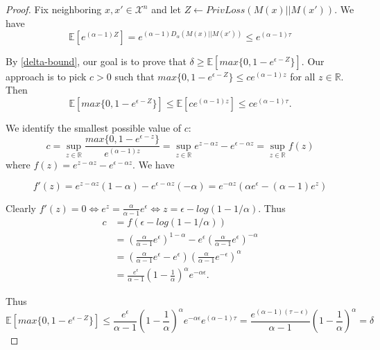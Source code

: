 \documentclass{article}
\begin{document}
\begin{proof}
Fix neighboring $x, x' \in  \mathcal{X}^n$ and let $Z \leftarrow PrivLoss(M(x) || M(x'))$. We have
\begin{equation}
    \mathbb{E}[e^{(\alpha - 1) Z}] = e^{(\alpha - 1)D_\alpha(M(x) || M(x'))} \leq e^{(\alpha - 1)\tau}
\end{equation}

By \ref{delta-bound}, our goal is to prove that $\delta \geq \mathbb{E}[max\{0, 1 - e^{\epsilon - Z} \}]$.
Our approach is to pick $c > 0$ such that $max\{0, 1 - e^{\epsilon - Z} \} \leq c e^{(\alpha - 1) z}$ for all $z \in \mathbb{R}$. Then
\begin{equation}
    \mathbb{E}[max\{0, 1 - e^{\epsilon - Z} \}] \leq \mathbb{E}[c e^{(\alpha - 1) z}] \leq c e^{(\alpha - 1) \tau}.
\end{equation}

We identify the smallest possible value of $c$:
\begin{equation}
    c = \sup\limits_{z \in \mathbb{R}} \frac{max\{0, 1 - e^{\epsilon - z} \}}{e^{(\alpha -1)z}}
    = \sup\limits_{z \in \mathbb{R}} e^{z - \alpha z} - e^{\epsilon - \alpha z}
    = \sup\limits_{z \in \mathbb{R}}f(z)
\end{equation}
where $f(z) = e^{z - \alpha z} - e^{\epsilon - \alpha z}$. We have

\begin{equation}
    f'(z) = e^{z - \alpha z} (1 - \alpha) - e^{\epsilon - \alpha z}(-\alpha)
    = e^{-\alpha z} (\alpha e^\epsilon - (\alpha - 1) e^z)
\end{equation}

Clearly $f'(z) = 0 \Longleftrightarrow e^z = \frac{\alpha}{\alpha - 1}e^{\epsilon} \Longleftrightarrow z = \epsilon - log(1 - 1/\alpha)$. Thus
\begin{align}
    c &= f(\epsilon - log(1 - 1 / \alpha)) \\
    &= \left(\frac{\alpha}{\alpha - 1} e^\epsilon \right)^{1 - \alpha} - e^{\epsilon} \left(\frac{\alpha}{\alpha - 1} e^\epsilon \right)^{- \alpha} \\
    &= \left(\frac{\alpha}{\alpha - 1} e^\epsilon  - e^\epsilon \right)  \left(\frac{\alpha}{\alpha - 1} e^{-\epsilon} \right)^{\alpha} \\
    &= \frac{e^\epsilon}{\alpha - 1} \left(1 - \frac{1}{\alpha} \right)^\alpha  e^{-\alpha \epsilon}.
\end{align}

Thus
\begin{equation}
    \mathbb{E}[max\{0, 1 - e^{\epsilon - Z}\}] \leq \frac{e^\epsilon}{\alpha - 1}\left(1  - \frac{1}{\alpha} \right) ^\alpha e^{-\alpha \epsilon} e^{(\alpha -1)\tau}
    = \frac{e^{(\alpha - 1)(\tau - \epsilon)}}{\alpha - 1} \left( 1 - \frac{1}{\alpha} \right)^\alpha
    = \delta
\end{equation}

\end{proof}
\end{document}
